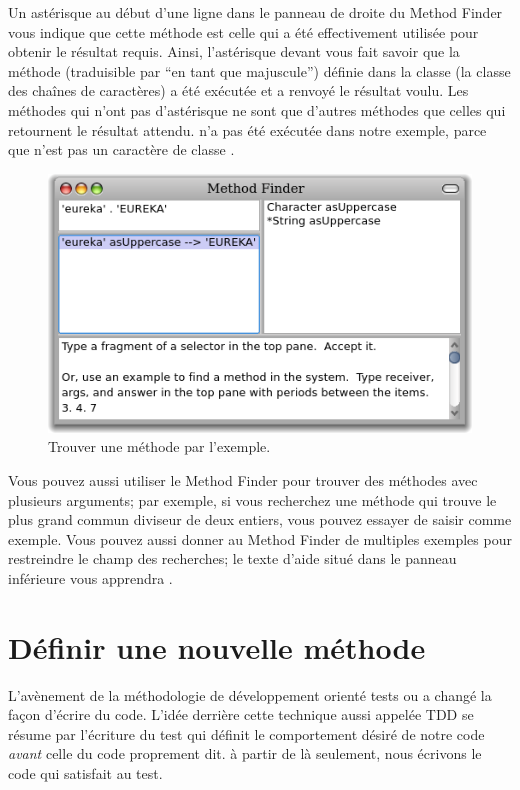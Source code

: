 \documentclass[a4paper,10pt,twoside]{book}
\begin{document}
Un astérisque au début d'une ligne dans le panneau de droite du
Method Finder vous indique que cette méthode est celle qui a été
effectivement utilisée pour obtenir le résultat requis.
Ainsi, l'astérisque devant  vous fait savoir
que la méthode  
(traduisible par ``en tant que majuscule'')
définie dans la classe  
(la classe des chaînes de caractères)
a été exécutée et a renvoyé le résultat voulu.
Les méthodes qui n'ont pas d'astérisque ne sont que d'autres
méthodes que celles qui retournent le résultat attendu.
 n'a pas été exécutée dans notre
exemple, parce que  n'est pas un caractère de classe .

\begin{figure}[hbt]
	{\centerline {\includegraphics[width=\textwidth]{MethodFinder-example1}}}
\caption{Trouver une méthode par l'exemple.
}
\end{figure}

Vous pouvez aussi utiliser le Method Finder pour trouver des
méthodes avec plusieurs arguments; par exemple, si vous recherchez
une méthode qui trouve le plus grand commun diviseur de deux
entiers, vous pouvez essayer de saisir  comme exemple.
Vous pouvez aussi donner au Method Finder de multiples exemples pour
restreindre le champ des recherches; le texte d'aide situé dans le
panneau inférieure vous apprendra . %

\section{Définir une nouvelle méthode}
L'avènement de la méthodologie de développement orienté tests
ou \cite{Beck03a} a changé la
façon d'écrire du code.
L'idée derrière cette technique aussi appelée TDD se résume par l'écriture
du test qui définit le comportement désiré de notre
code \emph{avant} celle du code proprement dit.
à partir de là seulement, nous écrivons le code qui satisfait au
test.
\end{document}
